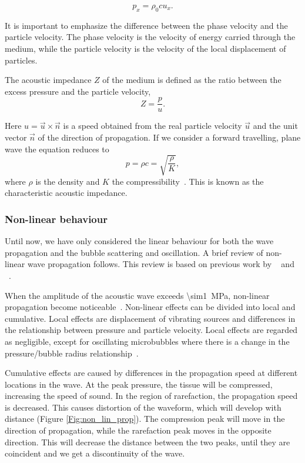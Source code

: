 \begin{equation}
\label{pressure wave}
p_x = \rho_0 c u_x.
\end{equation}

It is important to emphasize the difference between the phase velocity and the particle velocity. The phase velocity is the velocity of energy carried through the medium, while the particle velocity is the velocity of the local displacement of particles.

The acoustic impedance $Z$ of the medium is defined as the ratio between the excess pressure and the particle velocity,
\begin{equation}
\label{acoustic impedance}
 Z = \frac{p}{u}.
\end{equation}
 
Here $u = \vec{u}\times \vec{n}$ is a speed obtained from the real particle velocity $\vec{u}$ and the unit vector $\vec{n}$ of the direction of propagation. If we consider a forward travelling, plane wave the equation reduces to 
\begin{equation}
p = \rho c = \sqrt{\frac{\rho}{K}},
\end{equation}
 where $\rho$ is the density and $K$ the compressibility~\cite{Healey2012}. This is known as the characteristic acoustic impedance.

\subsubsection{Non-linear behaviour}
Until now, we have only considered the linear behaviour for both the wave propagation and the bubble scattering and oscillation. A brief review of non-linear wave propagation follows. This review is based on previous work by ~\citet{Uck2002} and ~\citet{Hoff2000}.

When the amplitude of the acoustic wave exceeds \SI{\sim1}{\mega\pascal}, non-linear propagation become noticeable~\cite{Uck2002}. Non-linear effects can be divided into local and cumulative. Local effects are displacement of vibrating sources and differences in the relationship between pressure and particle velocity. Local effects are regarded as negligible, except for oscillating microbubbles where there is a change in the pressure/bubble radius relationship~\cite{Uck2002}. 

Cumulative effects are caused by differences in the propagation speed at different locations in the wave. At the peak pressure, the tissue will be compressed, increasing the speed of sound. In the region of rarefaction, the propagation speed is decreased.  This causes distortion of the waveform, which will develop with distance (Figure \ref{Fig:non_lin_prop}). The compression peak will move in the direction of propagation, while the rarefaction peak moves in the opposite direction. This will decrease the distance between the two peaks, until they are coincident and we get a discontinuity of the wave. 


